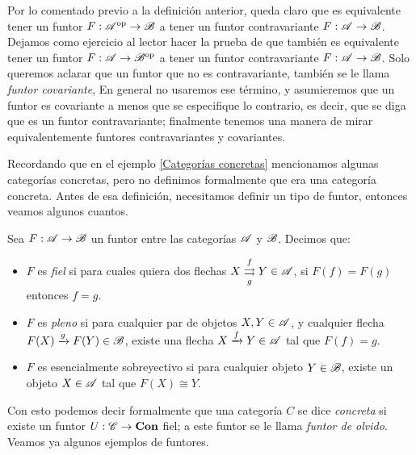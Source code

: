 \documentclass{comunicaciones}
\begin{document}
Por lo comentado previo a la definición anterior, queda claro que es equivalente tener un funtor $F:\mathscr A^{\mathrm{op}}\to\mathscr B$ a tener un funtor contravariante $F:\mathscr A\to\mathscr B$.
Dejamos como ejercicio al lector hacer la prueba de que también es equivalente tener un funtor $F:\mathscr A\to\mathscr B^{\mathrm{op}}$ a tener un funtor contravariante $F:\mathscr A\to\mathscr B$.
Solo queremos aclarar que un funtor que no es contravariante, también se le llama \emph{funtor covariante}, En general no usaremos ese término,
y asumieremos que un funtor es covariante a menos que se especifique lo contrario, es decir, que se diga que es un funtor contravariante; finalmente tenemos
una manera de mirar equivalentemente funtores contravariantes y covariantes.

Recordando que en el ejemplo \ref{Categorías concretas} mencionamos algunas categorías concretas, pero no definimos formalmente que era una categoría concreta.
Antes de esa definición, necesitamos definir un tipo de funtor, entonces veamos algunos cuantos.

\begin{dfn}
    Sea $F:\mathscr A\to\mathscr B$ un funtor entre las categorías $\mathscr A$ y $\mathscr B$. Decimos que:
    \begin{itemize}
        \item $F$ es \emph{fiel} si para cuales quiera dos flechas $X\overset{f}{\underset{g}{\rightrightarrows}}Y\in\mathscr A$, si $F(f)=F(g)$ entonces $f=g$.
        \item $F$ es \emph{pleno} si para cualquier par de objetos $X,Y\in\mathscr A$, y cualquier flecha $F(X)\xrightarrow{g}F(Y)\in\mathscr B$, existe una flecha 
        $X\xrightarrow{f}Y\in\mathscr A$ tal que $F(f)=g$.
        \item $F$ es esencialmente sobreyectivo si para cualquier objeto $Y\in\mathscr B$, existe un objeto $X\in\mathscr A$ tal que $F(X)\cong Y$.
    \end{itemize}
\end{dfn}

Con esto podemos decir formalmente que una categoría $C$ se dice \emph{concreta} si existe un funtor $U:\mathscr C\to\mathbf{Con}$ fiel; a este funtor se le llama 
\emph{funtor de olvido}. Veamos ya algunos ejemplos de funtores.
\end{document}
